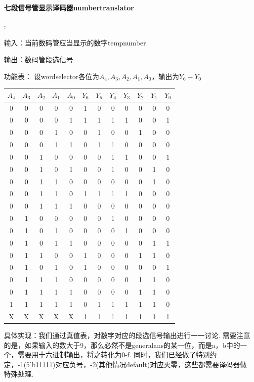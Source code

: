 \documentclass[UTF8]{ctexart}
\begin{document}
\paragraph{七段信号管显示译码器numbertranslator}:\par
输入：当前数码管应当显示的数字tempnumber\par
输出：数码管段选信号\par
功能表：
设wordselector各位为$A_4,A_3,A_2,A_1,A_0$，输出为$Y_6-Y_0$
\begin{table}[H]\begin{center}
    \begin{tabular}{c c c c c|c c c c c c c}
        \hline
        $A_4$&$A_3$&$A_2$&$A_1$&$A_0$&$Y_6$&$Y_5$&$Y_4$&$Y_3$&$Y_2$&$Y_1$&$Y_0$\\
        \hline
        0&0&0&0&0&1&0&0&0&0&0&0\\
        \hline
        0&0&0&0&1&1&1&1&1&0&0&1\\
        \hline
        0&0&0&1&0&0&1&0&0&1&0&0\\
        \hline
        0&0&0&1&1&0&1&1&0&0&0&0\\
        \hline
        0&0&1&0&0&0&0&1&1&0&0&1\\
        \hline
        0&0&1&0&1&0&0&1&0&0&1&0\\
        \hline
        0&0&1&1&0&0&0&0&0&0&1&0\\
        \hline
        0&0&1&1&0&1&1&1&1&0&0&0\\
        \hline
        0&0&1&1&1&0&0&0&0&0&0&0\\
        \hline
        0&1&0&0&0&0&0&1&0&0&0&0\\
        \hline
        0&1&0&1&0&0&0&0&1&0&0&0\\
        \hline
        0&1&0&1&1&0&0&0&0&0&1&1\\
        \hline
        0&1&1&0&0&1&0&0&0&1&1&0\\
        \hline
        0&1&0&1&0&1&0&0&0&0&0&1\\
        \hline
        0&1&1&1&0&0&0&0&0&1&1&0\\
        \hline
        0&1&1&1&1&0&0&0&0&1&1&0\\
        \hline
        1&1&1&1&1&0&1&1&1&1&1&0\\
        \hline
        X&X&X&X&X&1&1&1&1&1&1&1\\
        \hline
    \end{tabular}
    \end{center}\end{table}
具体实现：我们通过真值表，对数字对应的段选信号输出进行一一讨论. 需要注意的是，如果输入的数大于9，那么必然不是generalans的某一位，而是a，b中的一个，需要用十六进制输出，将之转化为0-f. 同时，我们已经做了特别约定，-1(5'b11111)对应负号，-2(其他情况default)对应灭零，这些都需要译码器做特殊处理.
\end{document}
